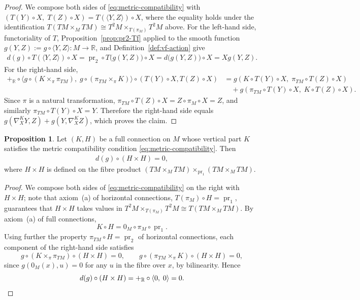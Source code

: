 \documentclass{amsart}
\newcommand{\R}{\mathbb{R}}
\DeclareMathOperator{\pr}{pr}
\theoremstyle{definition}
\newtheorem{prop}[thm]{Proposition}
\begin{document}
\begin{proof}
  We compose both sides of \eqref{eq:metric-compatibility} with
  $(T(Y)\circ X,\; T(Z) \circ X) = T(\langle Y, Z\rangle) \circ X$,
  where the equality holds under the identification
  $T(TM \times_M TM) \cong T^2M \times_{T(\pi_M)} T^2M$ above.
  For the left-hand side, functoriality of $T$,
  Proposition~\ref{prop:pr2-Tf} applied to the smooth function
  $g(Y, Z) := g \circ \langle Y, Z \rangle \colon M \to \R$, and
  Definition~\ref{def:vf-action} give
  \begin{align*}
    d(g)\circ T(\langle Y, Z\rangle) \circ X
      = \pr_2 \circ T\bigl(g(Y, Z)\bigr) \circ X
      = d\bigl(g(Y, Z)\bigr) \circ X
      = Xg(Y, Z).
  \end{align*}
  For the right-hand side,
  \begin{align*}
    +_{\R} \circ \langle g \circ (K \times_{\pi} \pi_{TM}),\;
    g \circ (\pi_{TM} \times_{\pi} K) \rangle \circ (T(Y)\circ X, T(Z) \circ X)
      &= g(K \circ T(Y)\circ X,\; \pi_{TM} \circ T(Z) \circ X) \\
      &\quad + g(\pi_{TM} \circ T(Y) \circ X,\; K \circ T(Z)\circ X).
  \end{align*}
  Since $\pi$ is a natural transformation,
  $\pi_{TM} \circ T(Z) \circ X = Z \circ \pi_M \circ X = Z$,
  and similarly $\pi_{TM} \circ T(Y) \circ X = Y$.
  Therefore the right-hand side equals
  $g(\nabla^K_X Y, Z) + g(Y, \nabla^K_X Z)$, which proves the claim.
\end{proof}

\begin{prop}\label{prop:vert-hori-compatibility}
Let $(K, H)$ be a full connection on $M$ whose vertical part $K$ satisfies
the metric compatibility condition \eqref{eq:metric-compatibility}. Then
\begin{align*}
    d(g) \circ (H \times H) = 0,
\end{align*}
where $H \times H$ is defined on the fibre product
$(TM \times_M TM) \times_{\pr_1} (TM \times_M TM)$.
\end{prop}

\begin{proof}
We compose both sides of \eqref{eq:metric-compatibility} on the right with $H \times H$; note that axiom~(a) of horizontal connections, $T(\pi_M) \circ H = \pr_1$, guarantees that $H \times H$ takes values in $T^2M \times_{T(\pi_M)} T^2M \cong T(TM \times_M TM)$.
By axiom~(a) of full connections,
\[
K \circ H = 0_M \circ \pi_M \circ \pr_1.
\]
Using further the property $\pi_{TM} \circ H = \pr_2$ of horizontal connections, each component of the right-hand side satisfies
\[
g \circ (K \times_\pi \pi_{TM}) \circ (H \times H) = 0,
\qquad
g \circ (\pi_{TM} \times_\pi K) \circ (H \times H) = 0,
\]
since $g(0_M(x), u) = 0$ for any $u$ in the fibre over $x$, by
bilinearity. Hence
\[
d(g) \circ (H \times H)
= +_{\R} \circ \langle 0,\; 0 \rangle
= 0. \qedhere
\]
\end{proof}
\end{document}
